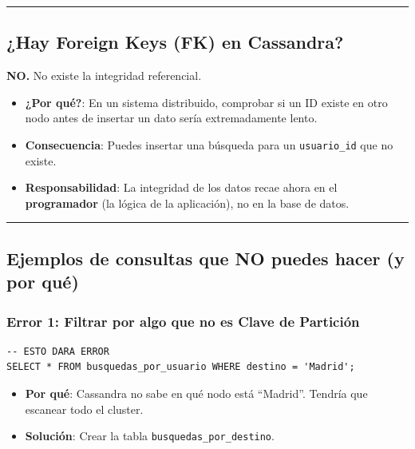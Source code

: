 \documentclass[12pt,a4paper]{article}
\begin{document}
\begin{center}\rule{0.5\linewidth}{0.5pt}\end{center}

\subsection{¿Hay Foreign Keys (FK) en Cassandra?}\label{hay-foreign-keys-fk-en-cassandra}

\textbf{NO.} No existe la integridad referencial.

\begin{itemize}
    \item \textbf{¿Por qué?}: En un sistema distribuido, comprobar si un ID existe en otro nodo antes de insertar un dato sería extremadamente lento.
    \item \textbf{Consecuencia}: Puedes insertar una búsqueda para un \texttt{usuario\_id} que no existe.
    \item \textbf{Responsabilidad}: La integridad de los datos recae ahora en el \textbf{programador} (la lógica de la aplicación), no en la base de datos.
\end{itemize}

\begin{center}\rule{0.5\linewidth}{0.5pt}\end{center}

\subsection{Ejemplos de consultas que NO puedes hacer (y por qué)}\label{ejemplos-de-consultas-que-no-puedes-hacer-y-por-quuxe9}

\subsubsection{Error 1: Filtrar por algo que no es Clave de Partición}

\begin{lstlisting}[language=CQL]
-- ESTO DARA ERROR
SELECT * FROM busquedas_por_usuario WHERE destino = 'Madrid';
\end{lstlisting}

\begin{itemize}
    \item \textbf{Por qué}: Cassandra no sabe en qué nodo está \enquote{Madrid}. Tendría que escanear todo el cluster.
    \item \textbf{Solución}: Crear la tabla \texttt{busquedas\_por\_destino}.
\end{itemize}
\end{document}
